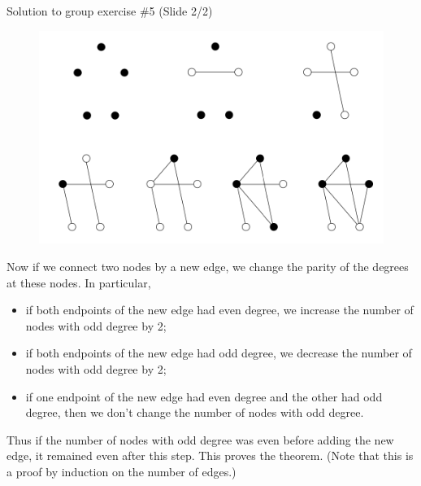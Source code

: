 \documentclass[10pt]{beamer}
\begin{document}
\begin{frame}{Solution to group exercise \#5 (Slide 2/2)} 
\footnotesize 

\begin{figure}
\includegraphics[width=.4\linewidth]{images/number_of_nodes_with_odd_degree_is_even.png}	
\end{figure}

\vspace{-.2cm}

Now if we connect two nodes by a new edge, we change the parity of the degrees at these nodes. In particular,
\begin{itemize}
\item if both endpoints of the new edge had even degree, we increase the number of nodes with odd degree by 2;
\item if both endpoints of the new edge had odd degree, we decrease the number of nodes with odd degree by 2;
\item if one endpoint of the new edge had even degree and the other had odd degree, then we don’t change the number of nodes with odd degree.
\end{itemize}

Thus if the number of nodes with odd degree was even before adding the new edge, it remained even after this step. This proves the theorem. (Note that this is a proof by induction on the number of edges.)

\end{frame}
\end{document}
